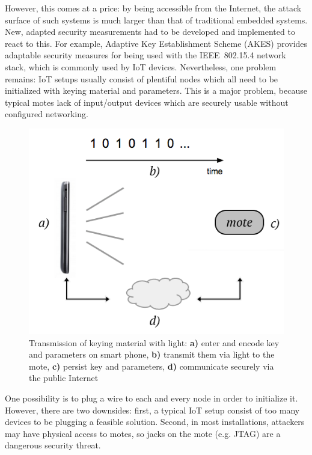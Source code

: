 \documentclass{sig-alternate} %
\begin{document}
However, this comes at a price: by being accessible from the Internet, the attack surface of such systems is much larger than that of traditional embedded systems.
New, adapted security measurements had to be developed and implemented to react to this.
For example, Adaptive Key Establishment Scheme (AKES) provides adaptable security measures for being used with the IEEE~802.15.4 network stack, which is commonly used by IoT devices. %
Nevertheless, one problem remains: IoT setups usually consist of plentiful nodes which all need to be initialized with keying material and parameters.
This is a major problem, because typical motes lack of input/output devices which are securely usable without configured networking.

\begin{figure}
	\centering
	\includegraphics[scale=.4]{images/overview.png}
	\caption{Transmission of keying material with light: \textbf{a)} enter and encode key and parameters on smart phone, \textbf{b)} transmit them via light to the mote, \textbf{c)} persist key and parameters, \textbf{d)} communicate securely via the public Internet }
	\label{fig:overview}
\end{figure}

One possibility is to plug a wire to each and every node in order to initialize it.
However, there are two downsides: first, a typical IoT setup consist of too many devices to be plugging a feasible solution. Second, in most installations, attackers may have physical access to motes, so jacks on the mote (e.g. JTAG) are a dangerous security threat.
\end{document}
